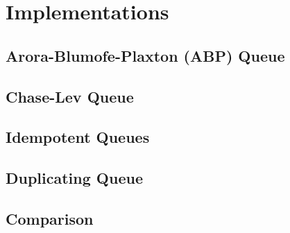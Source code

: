 \section{Implementations}
\label{sec:implementations}

\subsection{Arora-Blumofe-Plaxton (ABP) Queue}

\subsection{Chase-Lev Queue}

\subsection{Idempotent Queues}

\subsection{Duplicating Queue}

\subsection{Comparison}
